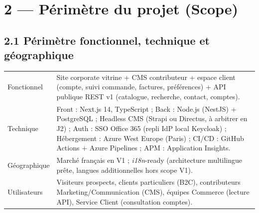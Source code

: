 \documentclass[11pt,a4paper,oneside]{report}
\begin{document}
\newpage
\section*{2 --- Périmètre du projet (Scope)}

\subsection*{2.1 Périmètre fonctionnel, technique et géographique}
\renewcommand{\arraystretch}{1.3}
\begin{tabularx}{\textwidth}{L{3cm} Y}
\toprule
{} &  \\
\midrule
Fonctionnel    & Site corporate vitrine + CMS contributeur + espace client (compte, suivi commande, factures, préférences) + API publique REST v1 (catalogue, recherche, contact, comptes). \\
Technique      & Front : Next.js 14, TypeScript ; Back : Node.js (NestJS) + PostgreSQL ; Headless CMS (Strapi ou Directus, à arbitrer en J2) ; Auth : SSO Office 365 (repli IdP local Keycloak) ; Hébergement : Azure West Europe (Paris) ; CI/CD : GitHub Actions + Azure Pipelines ; APM : Application Insights. \\
Géographique   & Marché français en V1 ; \emph{i18n}-ready (architecture multilingue prête, langues additionnelles hors scope V1). \\
Utilisateurs   & Visiteurs prospects, clients particuliers (B2C), contributeurs Marketing/Communication (CMS), équipes Commerce (lecture API), Service Client (consultation comptes). \\
\bottomrule
\end{tabularx}
\end{document}
